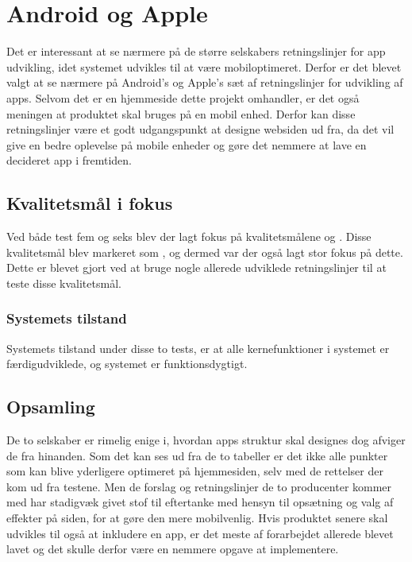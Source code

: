 \section{Android og Apple}
Det er interessant at se nærmere på de større selskabers retningslinjer for app udvikling, idet systemet udvikles til at være mobiloptimeret. Derfor er det blevet valgt at se nærmere på Android's og Apple's sæt af retningslinjer for udvikling af apps. Selvom det er en hjemmeside dette projekt omhandler, er det også meningen at produktet skal bruges på en mobil enhed. Derfor kan disse retningslinjer være et godt udgangspunkt at designe websiden ud fra, da det vil give en bedre oplevelse på mobile enheder og gøre det nemmere at lave en decideret app i fremtiden.

\subsection{Kvalitetsmål i fokus}
Ved både test fem og seks blev der lagt fokus på kvalitetsmålene  og . Disse kvalitetsmål blev markeret som , og dermed var der også lagt stor fokus på dette. Dette er blevet gjort ved at bruge nogle allerede udviklede retningslinjer til at teste disse kvalitetsmål.

\subsubsection{Systemets tilstand}
Systemets tilstand under disse to tests, er at alle kernefunktioner i systemet er færdigudviklede, og systemet er funktionsdygtigt. 





\subsection{Opsamling}
De to selskaber er rimelig enige i, hvordan apps struktur skal designes dog afviger de fra hinanden. Som det kan ses ud fra de to tabeller er det ikke alle punkter som kan blive yderligere optimeret på hjemmesiden, selv med de rettelser der kom ud fra testene. Men de forslag og retningslinjer de to producenter kommer med har stadigvæk givet stof til eftertanke med hensyn til opsætning og valg af effekter på siden, for at gøre den mere mobilvenlig. Hvis produktet senere skal udvikles til også at inkludere en app, er det meste af forarbejdet allerede blevet lavet og det skulle derfor være en nemmere opgave at implementere.